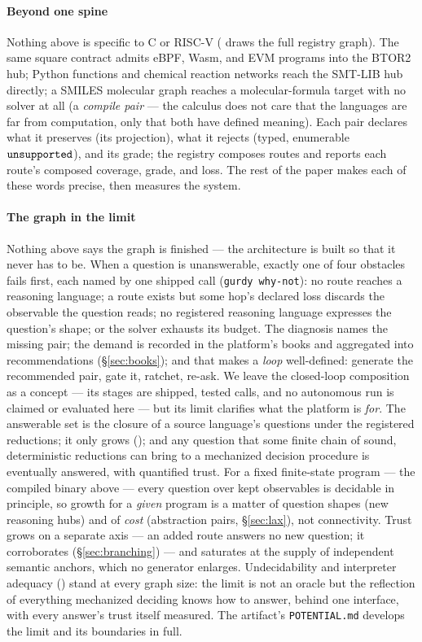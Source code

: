 \paragraph{Beyond one spine}
Nothing above is specific to C or RISC-V
( draws the full registry graph). The same square contract admits
eBPF, Wasm, and EVM programs into the BTOR2 hub; Python functions and
chemical reaction networks reach the SMT-LIB hub directly; a SMILES
molecular graph reaches a molecular-formula target with no solver at all
(a \emph{compile pair} --- the calculus does not care that the languages
are far from computation, only that both have defined meaning). Each
pair declares what it preserves (its projection), what it rejects (typed,
enumerable $\mathtt{unsupported}$), and its grade; the registry composes routes
and reports each route's composed coverage, grade, and loss. The rest of
the paper makes each of these words precise, then measures the system.

\ifarxiv
\paragraph{The graph in the limit}
Nothing above says the graph is finished --- the architecture is built
so that it never has to be. When a question is unanswerable, exactly
one of four obstacles fails first, each named by one shipped call
(\texttt{gurdy why-not}): no route reaches a reasoning language; a
route exists but some hop's declared loss discards the observable the
question reads; no registered reasoning language expresses the
question's shape; or the solver exhausts its budget. The diagnosis
names the missing pair; the demand is recorded in the platform's
books and aggregated into recommendations (\S\ref{sec:books}); and
that makes a \emph{loop} well-defined: generate the recommended pair,
gate it, ratchet, re-ask. We leave the closed-loop composition as a
concept --- its stages are shipped, tested calls, and no autonomous
run is claimed or evaluated here --- but its limit
clarifies what the platform is \emph{for}. The answerable set is the
closure of a source language's questions under the registered
reductions; it only grows (); and any question that
some finite chain of sound, deterministic reductions can bring to a
mechanized decision procedure is eventually answered, with quantified
trust. For a fixed finite-state program --- the compiled binary
above --- every question over kept observables is decidable in
principle, so growth for a \emph{given} program is a matter of
question shapes (new reasoning hubs) and of \emph{cost} (abstraction
pairs, \S\ref{sec:lax}), not connectivity. Trust grows on a separate
axis --- an added route answers no new question; it corroborates
(\S\ref{sec:branching}) --- and saturates at the supply of independent
semantic anchors, which no generator enlarges. Undecidability and
interpreter adequacy () stand at every graph size:
the limit is not an oracle but the reflection of everything mechanized
deciding knows how to answer, behind one interface, with every
answer's trust itself measured. The artifact's \texttt{POTENTIAL.md}
develops the limit and its boundaries in full.
\fi
